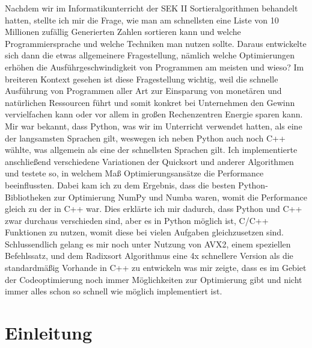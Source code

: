 \documentclass[11pt,a4paper]{article}
\begin{document}
Nachdem wir im Informatikunterricht der SEK II Sortieralgorithmen behandelt hatten,
stellte ich mir die Frage, wie man am schnellsten eine Liste von 10 Millionen zufällig Generierten Zahlen
sortieren kann und welche Programmiersprache und welche Techniken man nutzen sollte.
Daraus entwickelte sich dann die etwas allgemeinere Fragestellung, 
nämlich welche Optimierungen erhöhen die Ausführgeschwindigkeit von Programmen am meisten und wieso?
Im breiteren Kontext gesehen ist diese Fragestellung wichtig, weil die schnelle Ausführung von Programmen aller Art
zur Einsparung von monetären und natürlichen Ressourcen führt und somit konkret bei Unternehmen den Gewinn
vervielfachen kann oder vor allem in großen Rechenzentren Energie sparen kann.
Mir war bekannt, dass Python, was wir im Unterricht verwendet hatten, als eine der langsamsten Sprachen gilt, 
weswegen ich neben Python auch noch C++ wählte, was allgemein als eine der schnellsten Sprachen gilt.
Ich implementierte anschließend verschiedene Variationen der Quicksort und anderer Algorithmen und testete so, 
in welchem Maß Optimierungsansätze die Performance beeinflussten.
Dabei kam ich zu dem Ergebnis, dass die besten Python-Bibliotheken zur Optimierung NumPy und Numba waren,
womit die Performance gleich zu der in C++ war.
Dies erklärte ich mir dadurch, dass Python und C++ zwar durchaus verschieden sind, aber es in Python möglich ist, C/C++ Funktionen zu
nutzen, womit diese bei vielen Aufgaben gleichzusetzen sind.
Schlussendlich gelang es mir noch unter Nutzung von AVX2, einem speziellen Befehlssatz, und dem Radixsort Algorithmus eine 4x schnellere Version als die standardmäßig 
Vorhande in C++ zu entwickeln was mir zeigte, dass es im Gebiet der Codeoptimierung noch immer Möglichkeiten zur Optimierung gibt
und nicht immer alles schon so schnell wie möglich implementiert ist.

\clearpage

\renewcommand*\contentsname{Inhaltsverzeichnis}

\tableofcontents

\clearpage

\section{Einleitung}
\end{document}
